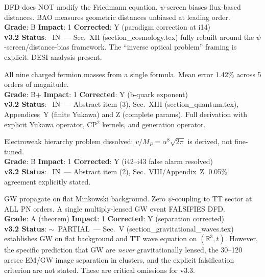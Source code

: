 \documentclass[11pt,a4paper]{article}
\newcommand{\vin}{\textcolor{statusIN}{\checkmark~IN}}
\newcommand{\vpartial}{\textcolor{statusPARTIAL}{$\sim$~PARTIAL}}
\begin{document}
\begin{tcolorbox}[colback=paradigm!5,colframe=paradigm,title=\textbf{F4: DFD Is a Distance-Bias Theory, Not Modified Expansion}]
DFD does NOT modify the Friedmann equation. $\psi$-screen biases flux-based distances. BAO measures geometric distances unbiased at leading order.\\
\textbf{Grade}: B \quad \textbf{Impact}: 1 \quad \textbf{Corrected}: Y (paradigm correction at i14)\\
\textbf{v3.2 Status}: \vin\ --- Sec.~XII (section\_cosmology.tex) fully rebuilt around the $\psi$-screen/distance-bias framework. The ``inverse optical problem'' framing is explicit. DESI analysis present.
\end{tcolorbox}

\begin{tcolorbox}[colback=paradigm!5,colframe=paradigm,title=\textbf{F5: Charged Fermion Mass Spectrum from $m_f = A_f \alpha^{n_f} v/\sqrt{2}$}]
All nine charged fermion masses from a single formula. Mean error 1.42\% across 5 orders of magnitude.\\
\textbf{Grade}: B+ \quad \textbf{Impact}: 1 \quad \textbf{Corrected}: Y (b-quark exponent)\\
\textbf{v3.2 Status}: \vin\ --- Abstract item (3), Sec.~XIII (section\_quantum.tex), Appendices~Y (finite Yukawa) and Z (complete params). Full derivation with explicit Yukawa operator, CP$^2$ kernels, and generation operator.
\end{tcolorbox}

\begin{tcolorbox}[colback=paradigm!5,colframe=paradigm,title=\textbf{F6: Higgs VEV from Planck Mass: $v = M_P \alpha^8 \sqrt{2\pi} = 246.09$~GeV}]
Electroweak hierarchy problem dissolved: $v/M_P = \alpha^8\sqrt{2\pi}$ is derived, not fine-tuned.\\
\textbf{Grade}: B \quad \textbf{Impact}: 1 \quad \textbf{Corrected}: Y (i42--i43 false alarm resolved)\\
\textbf{v3.2 Status}: \vin\ --- Abstract item (2), Sec.~VIII/Appendix~Z. 0.05\% agreement explicitly stated.
\end{tcolorbox}

\begin{tcolorbox}[colback=paradigm!5,colframe=paradigm,title=\textbf{F7: GW Never Gravitationally Lensed in DFD (Structural Theorem)}]
GW propagate on flat Minkowski background. Zero $\psi$-coupling to TT sector at ALL PN orders. A single multiply-lensed GW event FALSIFIES DFD.\\
\textbf{Grade}: A (theorem) \quad \textbf{Impact}: 1 \quad \textbf{Corrected}: Y (separation corrected)\\
\textbf{v3.2 Status}: \vpartial\ --- Sec.~V (section\_gravitational\_waves.tex) establishes GW on flat background and TT wave equation on $(\mathbb{R}^3, t)$. However, the specific prediction that GW are \emph{never} gravitationally lensed, the 30--120 arcsec EM/GW image separation in clusters, and the explicit falsification criterion are not stated. These are critical omissions for v3.3.
\end{tcolorbox}
\end{document}
